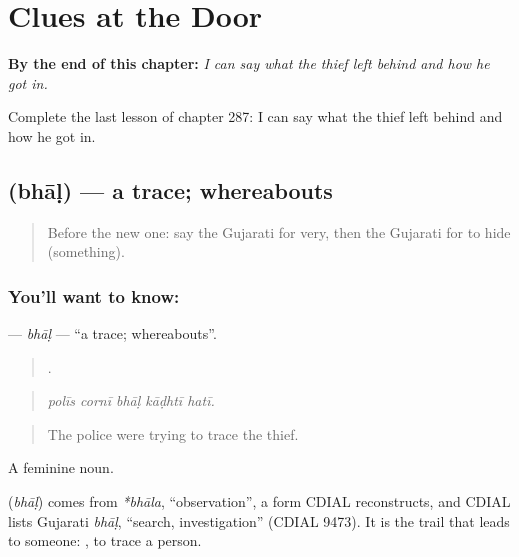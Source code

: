 
\chapter{Clues at the Door}
\label{ch:gu-clues-at-the-door}

\begin{chapteropening}
\textbf{By the end of this chapter:} \emph{I can say what the thief left behind and how he got in.}

Complete the last lesson of chapter 287: I can say what the thief left behind and how he got in.
\end{chapteropening}

\section[\texorpdfstring{\gu{ભાળ} (bhāḷ)}{ભાળ (bhāḷ)}]{ (bhāḷ) — a trace; whereabouts}

\label{lesson:GU-C287-bhal}



\begin{quote}
Before the new one: say the Gujarati for very, then the Gujarati for to hide (something).
\end{quote}

\subsection*{You'll want to know: }
\textbf{} — \emph{bhāḷ} — \textquotedblleft{}a trace; whereabouts\textquotedblright{}.

\begin{quote}
    .
\end{quote}

\begin{quote}
\emph{polīs cornī bhāḷ kāḍhtī hatī.}
\end{quote}

\begin{quote}
The police were trying to trace the thief.
\end{quote}

A feminine noun.

\begin{cousinweb}
\textbf{} (\emph{bhāḷ}) comes from \emph{*bhāla}, \textquotedblleft{}observation\textquotedblright{}, a form CDIAL reconstructs, and CDIAL lists Gujarati \emph{bhāḷ}, \textquotedblleft{}search, investigation\textquotedblright{} (CDIAL 9473). It is the trail that leads to someone: \textbf{ }, to trace a person.
\end{cousinweb}

